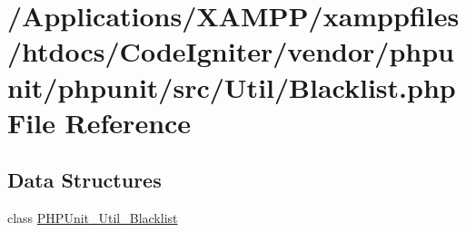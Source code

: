 \hypertarget{phpunit_2phpunit_2src_2_util_2_blacklist_8php}{}\section{/\+Applications/\+X\+A\+M\+P\+P/xamppfiles/htdocs/\+Code\+Igniter/vendor/phpunit/phpunit/src/\+Util/\+Blacklist.php File Reference}
\label{phpunit_2phpunit_2src_2_util_2_blacklist_8php}
\subsection*{Data Structures}
\begin{DoxyCompactItemize}
\item 
class \mbox{\hyperlink{class_p_h_p_unit___util___blacklist}{P\+H\+P\+Unit\+\_\+\+Util\+\_\+\+Blacklist}}
\end{DoxyCompactItemize}
